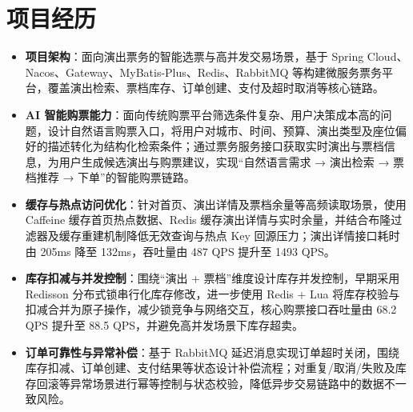 \documentclass[10pt]{article}
\begin{document}

    \section[项目经历]{\makebox[\iconwidth][c]{\color{primarycolor}{\faProjectDiagram}}\quad 项目经历}
    
    \begin{itemize}
        \item \textbf{项目架构}：面向演出票务的智能选票与高并发交易场景，基于 Spring Cloud、Nacos、Gateway、MyBatis-Plus、Redis、RabbitMQ 等构建微服务票务平台，覆盖演出检索、票档库存、订单创建、支付及超时取消等核心链路。
    
        \item \textbf{AI 智能购票能力}：面向传统购票平台筛选条件复杂、用户决策成本高的问题，设计自然语言购票入口，将用户对城市、时间、预算、演出类型及座位偏好的描述转化为结构化检索条件；通过票务服务接口获取实时演出与票档信息，为用户生成候选演出与购票建议，实现“自然语言需求 → 演出检索 → 票档推荐 → 下单”的智能购票链路。
    
        \item \textbf{缓存与热点访问优化}：针对首页、演出详情及票档余量等高频读取场景，使用 Caffeine 缓存首页热点数据、Redis 缓存演出详情与实时余量，并结合布隆过滤器及缓存重建机制降低无效查询与热点 Key 回源压力；演出详情接口耗时由 205ms 降至 132ms，吞吐量由 487 QPS 提升至 1493 QPS。
    
        \item \textbf{库存扣减与并发控制}：围绕“演出 + 票档”维度设计库存并发控制，早期采用 Redisson 分布式锁串行化库存修改，进一步使用 Redis + Lua 将库存校验与扣减合并为原子操作，减少锁竞争与网络交互，核心购票接口吞吐量由 68.2 QPS 提升至 88.5 QPS，并避免高并发场景下库存超卖。
    
        \item \textbf{订单可靠性与异常补偿}：基于 RabbitMQ 延迟消息实现订单超时关闭，围绕库存扣减、订单创建、支付结果等状态设计补偿流程；对重复/取消/失败及库存回滚等异常场景进行幂等控制与状态校验，降低异步交易链路中的数据不一致风险。
    \end{itemize}
\end{document}

